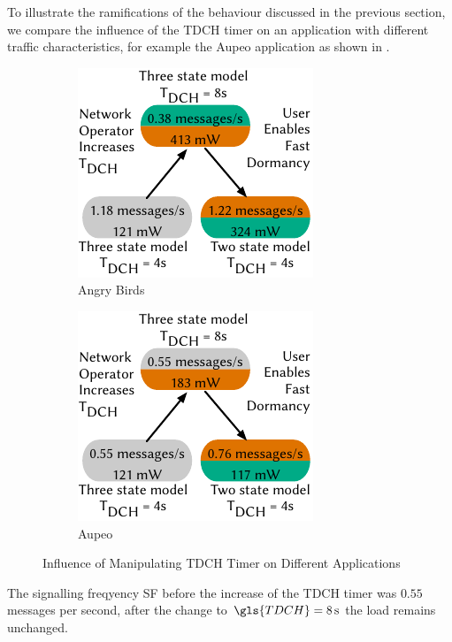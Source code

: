 To illustrate the ramifications of the behaviour discussed in the previous section, we compare the influence of the \gls{TDCH} timer on an application with different traffic characteristics, for example the Aupeo application as shown in .
\begin{figure}
	\begin{subfigure}[b]{.5\textwidth}
	\centering
	\includegraphics{network/network_traces/numerical_results/figures/consequences_angry_birds}
	\caption{Angry Birds}\label{fig:network:network_traces:numerical_results:consequences:angry_birds}
	\end{subfigure} 
	\begin{subfigure}[b]{.5\textwidth}
	\centering
	\includegraphics{network/network_traces/numerical_results/figures/consequences_aupeo}
	\caption{Aupeo}\label{fig:network:network_traces:numerical_results:consequences:aupeo}
	\end{subfigure}

	\caption{Influence of Manipulating \gls{TDCH} Timer on Different Applications}\label{fig:network:network_traces:numerical_results:consequences}
\end{figure}
The signalling freqyency \gls{SF} before the increase of the \gls{TDCH} timer was \(0.55\) messages per second, after the change to \(\gls{TDCH} = \SI{8}{\second}\) the load remains unchanged.
